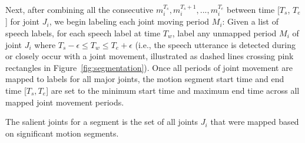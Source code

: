 Next, after combining all the consecutive $m_i^{T_s}, m_i^{T_s+1}, ..., m_i^{T_e}$ between time [$T_s$, $T_e$] for joint $J_i$, we begin labeling each joint moving period $M_i$:
%
Given a list of speech labels, for each speech label at time $T_w$, label any unmapped period $M_i$ of joint \(J_i\) where $T_s - \epsilon \leq T_w \leq T_e + \epsilon$ (i.e., the speech utterance is detected during or closely occur with a joint movement, illustrated as dashed lines crossing pink rectangles in Figure~\ref{fig:segmentation}).
%
%
%
%
%
%
Once all periods of joint movement are mapped to labels for all major joints, the motion segment start time and end time [$T_s,T_e$] are set to the minimum start time and maximum end time across all mapped joint movement periods.

The salient joints for a segment is the set of all joints \(J_i\) that were mapped based on significant motion segments.

